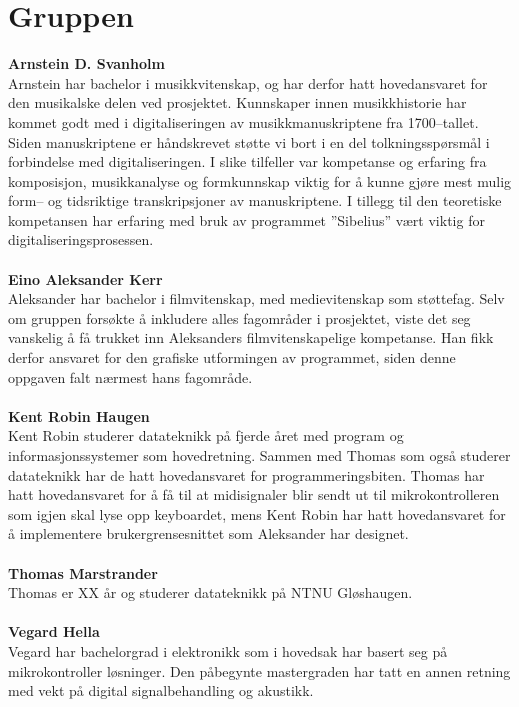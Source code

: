 \chapter{Gruppen}

\textbf{Arnstein D. Svanholm} \\
Arnstein har bachelor i musikkvitenskap, og har derfor hatt hovedansvaret for den musikalske delen ved prosjektet. Kunnskaper innen musikkhistorie har kommet godt med i digitaliseringen av musikkmanuskriptene fra 1700–tallet. Siden manuskriptene er håndskrevet støtte vi bort i en del tolkningsspørsmål i forbindelse med digitaliseringen. I slike tilfeller var kompetanse og erfaring fra komposisjon, musikkanalyse og formkunnskap viktig for å kunne gjøre mest mulig form– og tidsriktige transkripsjoner av manuskriptene. I tillegg til den teoretiske kompetansen har erfaring med bruk av programmet ”Sibelius” \cite{sibelius} vært viktig for digitaliseringsprosessen.\\\\
\textbf{Eino Aleksander Kerr} \\
Aleksander har bachelor i filmvitenskap, med medievitenskap som støttefag. Selv om gruppen forsøkte å inkludere alles fagområder i prosjektet, viste det seg vanskelig å få trukket inn Aleksanders filmvitenskapelige kompetanse. Han fikk derfor ansvaret for den grafiske utformingen av programmet, siden denne oppgaven falt nærmest hans fagområde.
\\\\
\textbf{Kent Robin Haugen} \\
Kent Robin studerer datateknikk på fjerde året med program og informasjonssystemer som hovedretning. Sammen med Thomas som også studerer datateknikk har de hatt hovedansvaret for programmeringsbiten. Thomas har hatt hovedansvaret for å få til at midisignaler blir sendt ut til mikrokontrolleren som igjen skal lyse opp keyboardet, mens Kent Robin har hatt hovedansvaret for å implementere brukergrensesnittet som Aleksander har designet. 
\\\\
\textbf{Thomas Marstrander} \\
Thomas er XX år og studerer datateknikk på NTNU Gløshaugen.\\\\
\textbf{Vegard Hella} \\
Vegard har bachelorgrad i elektronikk som i hovedsak har basert seg på mikrokontroller løsninger. Den påbegynte mastergraden har tatt en annen retning med vekt på digital signalbehandling og akustikk.\\
